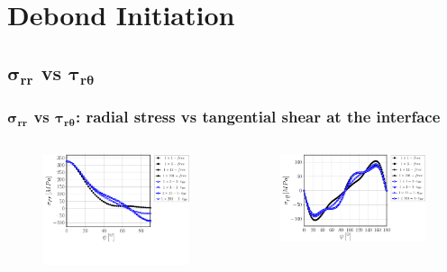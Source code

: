 \documentclass[first,firstsupp,lastsupp,last,hyperref,table]{ETHclass}
\begin{document}
\section{Debond Initiation}

\subsection{$\mathbf{\sigma_{rr}}$ vs $\mathbf{\tau_{r\theta}}$}

\begin{frame}
\frametitle{\vspace{0.2cm}\small $\mathbf{\sigma_{rr}}$ vs $\mathbf{\tau_{r\theta}}$: radial stress vs tangential shear at the interface}
\vspace{-.75cm}
\centering
\begin{columns}[c]
\centering
\begin{column}{0.5\textwidth}
\centering
\begin{figure}
\centering
\includegraphics[width=\columnwidth]{vf60-nodamage-sigmar-notol.pdf}
\end{figure}
\end{column}
\begin{column}{0.5\textwidth}
\centering
\begin{figure}
\centering
\includegraphics[width=\columnwidth]{vf60-nodamage-taurt.pdf}

\end{figure}
\end{column}
\end{columns}
\end{frame}
\end{document}
